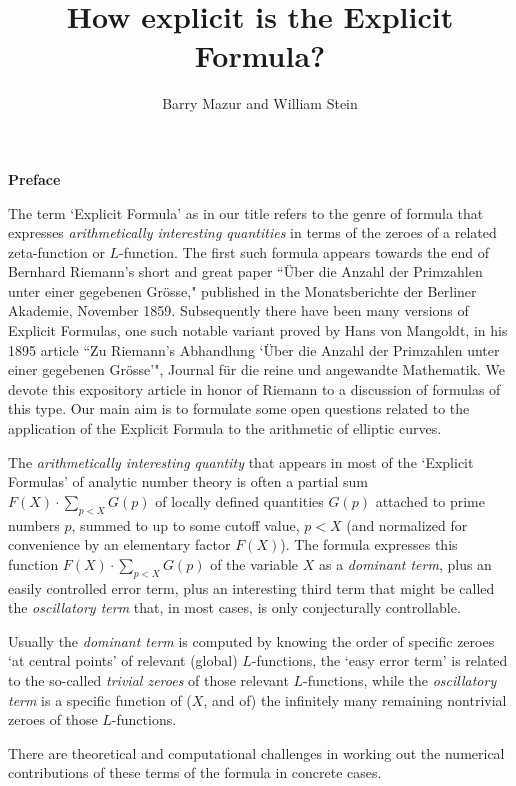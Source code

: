 \documentclass[11pt]{article}
\title{How explicit is the Explicit Formula?}
\author{Barry Mazur and William Stein}
\theoremstyle{plain}
\theoremstyle{definition}
\numberwithin{equation}{section}
\numberwithin{figure}{section}
\numberwithin{table}{section}
\begin{document}
\maketitle


\vskip10pt
\centerline{\bf Preface}
\vskip10pt

The  term `Explicit Formula' as in our title refers to the genre of formula that expresses {\it arithmetically interesting quantities} in terms of the zeroes of  a related zeta-function or $L$-function.  The first such formula appears towards the end of Bernhard Riemann's short and great paper  ``\"{U}ber die Anzahl der Primzahlen unter einer
gegebenen Gr\"{o}sse," published in the
Monatsberichte der Berliner Akademie,
November 1859.  Subsequently there have been many versions of Explicit Formulas, one such notable variant  proved by Hans von  Mangoldt, in his 1895 article  ``Zu Riemann's Abhandlung `\"{U}ber die Anzahl der Primzahlen unter einer gegebenen Gr\"{o}sse'", Journal f\"{u}r die reine und angewandte Mathematik.  We devote this expository  article in honor of Riemann to a discussion of formulas of this type. Our main aim is to formulate some open questions related to the application of the Explicit Formula to the arithmetic of elliptic curves.

  The {\it arithmetically interesting quantity} that appears in most of the `Explicit Formulas' of analytic number theory is often  a partial sum $F(X)\cdot\sum_{p<X}G(p)$ of locally defined quantities $G(p)$ attached to prime numbers $p$, summed to up to some cutoff value, $p<X$  (and normalized for convenience by an elementary factor $F(X)$). The formula expresses this function $F(X)\cdot\sum_{p<X}G(p)$ of the variable $X$ as a {\it dominant term}, plus an easily controlled error term, plus an interesting third term that might be called the {\it oscillatory term} that, in most cases, is only conjecturally controllable.

  Usually the {\it dominant term} is computed by knowing the order of specific zeroes `at central points' of relevant (global) $L$-functions, the `easy error term' is related to the so-called {\it trivial zeroes} of those relevant $L$-functions, while the {\it oscillatory term} is  a specific function of ($X$, and of) the infinitely many remaining nontrivial zeroes of those $L$-functions.


 There are theoretical and computational challenges in working out the  numerical contributions of these terms of the formula in concrete cases.
\end{document}
